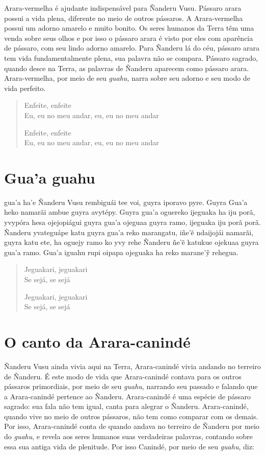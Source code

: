  Arara-vermelha é ajudante indispensável para Ñanderu Vusu. Pássaro
arara possui a vida plena, diferente no meio de outros pássaros. A
Arara-vermelha possui um adorno amarelo e muito bonito. Os seres humanos da Terra têm uma venda sobre seus olhos e por isso o pássaro arara é visto por eles com aparência de pássaro, com seu lindo adorno amarelo. Para Ñanderu lá do céu, pássaro arara tem vida
fundamentalmente plena, sua palavra não se compara. Pássaro sagrado,
quando desce na Terra, as palavras de Ñanderu aparecem como pássaro
arara. Arara-vermelha, por meio de seu \textit{guahu,} narra sobre seu
adorno e seu modo de vida perfeito.

\begin{verse}
Enfeite, enfeite\\
Eu, eu no meu andar, eu, eu no meu andar

Enfeite, enfeite\\
Eu, eu no meu andar, eu, eu no meu andar
\end{verse}

\chapter{Gua'a guahu}

 gua'a ha'e Ñanderu Vusu rembiguái tee voi, guyra iporavo pyre.
Guyra Gua'a heko namarãi ambue guyra avytépy. Guyra gua'a oguereko
ijeguaka ha iju porã, yvypóra hesa ojejopiágui guyra gua'a ojeguaa guyra
ramo, ijeguaka iju porã porã. Ñanderu yvateguápe katu guyra gua'a reko
marangatu, iñe'ẽ ndaijojái namarãi, guyra katu ete, ha oguejy ramo ko
yvy rehe Ñanderu ñe'ẽ katukue ojekuaa guyra gua'a ramo. Gua'a iguahu
rupi oipapa ojeguaka ha reko marane'ỹ rehegua.

\begin{verse}
Jeguakari, jeguakari\\
Se sejá, se sejá

Jeguakari, jeguakari\\
Se sejá, se sejá
\end{verse}

\chapter{O canto da Arara-canindé}

 Ñanderu Vusu ainda vivia aqui na Terra, Arara-canindé vivia
andando no terreiro de Ñanderu. É este modo de vida que Arara-canindé
contava para os outros pássaros primordiais, por meio de seu
\textit{guahu}, narrando seu passado e falando que a Arara-canindé
pertence ao Ñanderu. Arara-canindé é uma espécie de pássaro sagrado: sua
fala não tem igual, canta para alegrar o Ñanderu. Arara-canindé, quando
vive no meio de outros pássaros, não tem como comparar com os demais.
Por isso, Arara-canindé conta de quando andava no terreiro de Ñanderu
por meio do \textit{guahu}, e revela aos seres humanos suas verdadeiras
palavras, contando sobre essa sua antiga vida de plenitude. Por isso
Canindé, por meio de seu \textit{guahu}, diz:

